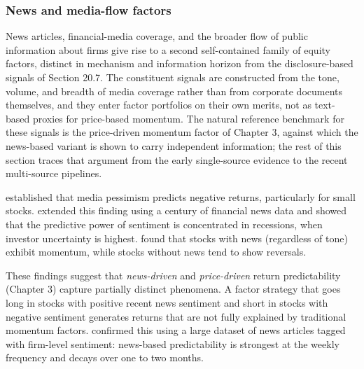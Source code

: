 \subsubsection{News and media-flow factors}

News articles, financial-media coverage, and the broader flow of public information about firms give rise to a second self-contained family of equity factors, distinct in mechanism and information horizon from the disclosure-based signals of Section 20.7. The constituent signals are constructed from the tone, volume, and breadth of media coverage rather than from corporate documents themselves, and they enter factor portfolios on their own merits, not as text-based proxies for price-based momentum. The natural reference benchmark for these signals is the price-driven momentum factor of Chapter 3, against which the news-based variant is shown to carry independent information; the rest of this section traces that argument from the early single-source evidence to the recent multi-source pipelines.

\cite{tetlock2007giving} established that media pessimism predicts negative returns, particularly for small stocks. \cite{garcia2013sentiment} extended this finding using a century of financial news data and showed that the predictive power of sentiment is concentrated in recessions, when investor uncertainty is highest. \cite{chan2003stock} found that stocks with news (regardless of tone) exhibit momentum, while stocks without news tend to show reversals.

These findings suggest that \textit{news-driven} and \textit{price-driven} return predictability (Chapter 3) capture partially distinct phenomena. A factor strategy that goes long in stocks with positive recent news sentiment and short in stocks with negative sentiment generates returns that are not fully explained by traditional momentum factors. \cite{heston2017news} confirmed this using a large dataset of news articles tagged with firm-level sentiment: news-based predictability is strongest at the weekly frequency and decays over one to two months.

